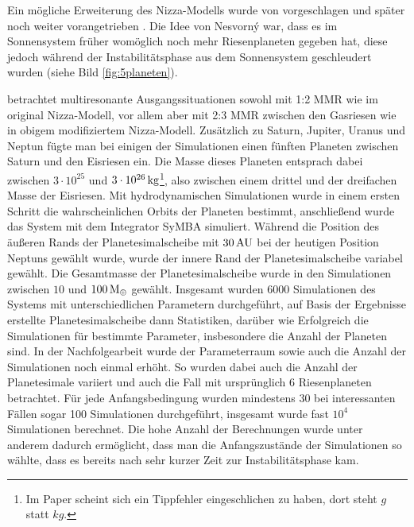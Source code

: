\documentclass[12pt,a4paper,twoside,open=right,bibliography=totoc]{scrbook}
\renewcommand{\cite}{ \citep}
\newcommand{\ME}{M_\oplus}
\begin{document}
Ein mögliche Erweiterung des Nizza-Modells wurde von \cite{Nesvorny2011} vorgeschlagen und später noch weiter vorangetrieben \cite{Nesvorny2012}. Die Idee von Nesvorný war, dass es im Sonnensystem früher womöglich noch mehr Riesenplaneten gegeben hat, diese jedoch während der Instabilitätsphase aus dem Sonnensystem geschleudert wurden (siehe Bild \ref{fig:5planeten}).

\cite{Nesvorny2011} betrachtet multiresonante Ausgangssituationen sowohl mit 1:2 MMR wie im original Nizza-Modell, vor allem aber mit 2:3 MMR zwischen den Gasriesen wie in obigem modifiziertem Nizza-Modell.
Zusätzlich zu Saturn, Jupiter, Uranus und Neptun fügte man bei einigen der Simulationen einen fünften Planeten zwischen Saturn und den Eisriesen ein. Die Masse dieses Planeten entsprach dabei zwischen $3\cdot10^{25}$ und $\unit[3\cdot10^{26}]{kg}$\footnote{Im Paper \cite{Nesvorny2011} scheint sich ein Tippfehler eingeschlichen zu haben, dort steht $\unit{g}$ statt $\unit{kg}$.}, also zwischen einem drittel und der dreifachen Masse der Eisriesen.
Mit hydrodynamischen Simulationen wurde in einem ersten Schritt die wahrscheinlichen Orbits der Planeten bestimmt, anschließend wurde das System mit dem Integrator SyMBA simuliert.
Während die Position des äußeren Rands der Planetesimalscheibe mit $\unit[30]{AU}$ bei der heutigen Position Neptuns gewählt wurde, wurde der innere Rand der Planetesimalscheibe variabel gewählt.
Die Gesamtmasse der Planetesimalscheibe wurde in den Simulationen zwischen $10$ und $\unit[100]{\ME}$ gewählt.
Insgesamt wurden 6000 Simulationen des Systems mit unterschiedlichen Parametern durchgeführt, auf Basis der Ergebnisse erstellte Planetesimalscheibe dann Statistiken, darüber wie Erfolgreich die Simulationen für bestimmte Parameter, insbesondere die Anzahl der Planeten sind.
In der Nachfolgearbeit \cite{Nesvorny2012} wurde der Parameterraum sowie auch die Anzahl der Simulationen noch einmal erhöht. So wurden dabei auch die Anzahl der Planetesimale variiert und auch die Fall mit ursprünglich 6 Riesenplaneten betrachtet. Für jede Anfangsbedingung wurden mindestens 30 bei interessanten Fällen sogar 100 Simulationen durchgeführt, insgesamt wurde fast $10^4$ Simulationen berechnet. Die hohe Anzahl der Berechnungen wurde unter anderem dadurch ermöglicht, dass man die Anfangszustände der Simulationen so wählte, dass es bereits nach sehr kurzer Zeit zur Instabilitätsphase kam.
\end{document}
